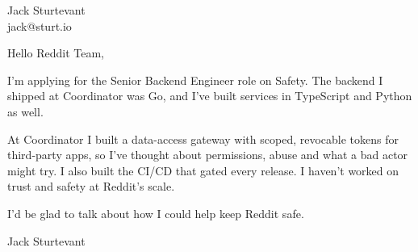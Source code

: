 \documentclass[11pt]{article}
\begin{document}
\raggedright

{\namefont\fontsize{20pt}{24pt}\selectfont Jack Sturtevant}\\[-0.3em]
jack@sturt.io

\vspace{1.2em}

Hello Reddit Team,

I'm applying for the Senior Backend Engineer role on Safety. The backend I shipped at Coordinator was Go, and I've built services in TypeScript and Python as well.

At Coordinator I built a data-access gateway with scoped, revocable tokens for third-party apps, so I've thought about permissions, abuse and what a bad actor might try. I also built the CI/CD that gated every release. I haven't worked on trust and safety at Reddit's scale.

I'd be glad to talk about how I could help keep Reddit safe.

\vspace{0.6em}
Jack Sturtevant
\end{document}
